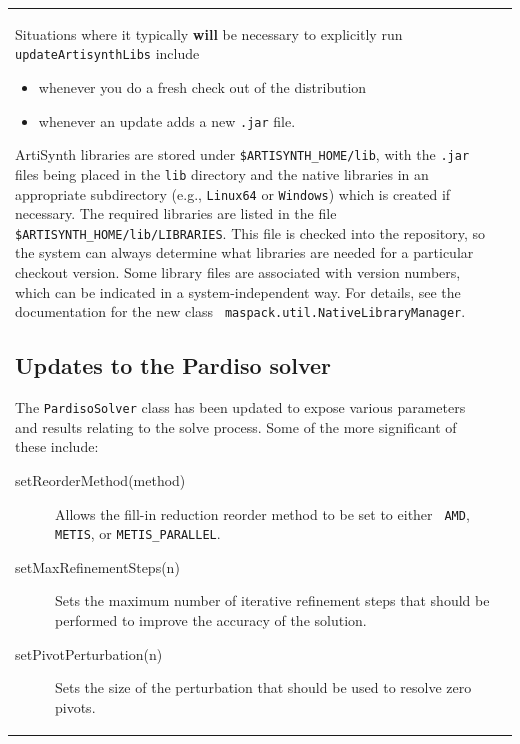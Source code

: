 \documentclass{article}
\begin{document}
\begin{tabular}{ll}
Situations where it typically {\bf will} be necessary to explicitly
run {\tt updateArtisynthLibs} include

\begin{itemize}

\item whenever you do a fresh check out of the distribution

\item whenever an update adds a new {\tt .jar} file.

\end{itemize}

ArtiSynth libraries are stored under {\tt \$ARTISYNTH\_HOME/lib}, with
the {\tt .jar} files being placed in the {\tt lib} directory and the
native libraries in an appropriate subdirectory (e.g., {\tt Linux64} or
{\tt Windows}) which is created if necessary. The required libraries
are listed in the file {\tt \$ARTISYNTH\_HOME/lib/LIBRARIES}. This
file is checked into the repository, so the system can always
determine what libraries are needed for a particular checkout version.
Some library files are associated with version numbers, which can be
indicated in a system-independent way. For details, see the
documentation for the new class {\tt
maspack.util.NativeLibraryManager}.

\subsection*{Updates to the Pardiso solver}

The {\tt PardisoSolver} class has been updated to expose various
parameters and results relating to the solve process. Some of the more
significant of these include:

\begin{description}

\item[setReorderMethod(method)] \mbox{}

Allows the fill-in reduction reorder method to be set to either {\tt
AMD}, {\tt METIS}, or {\tt METIS\_PARALLEL}.

\item[setMaxRefinementSteps(n)] \mbox{}

Sets the maximum number of iterative refinement steps that should be
performed to improve the accuracy of the solution.

\item[setPivotPerturbation(n)] \mbox{} 

Sets the size of the perturbation that should be used to resolve zero
pivots.


\end{description}
\end{tabular}
\end{document}
